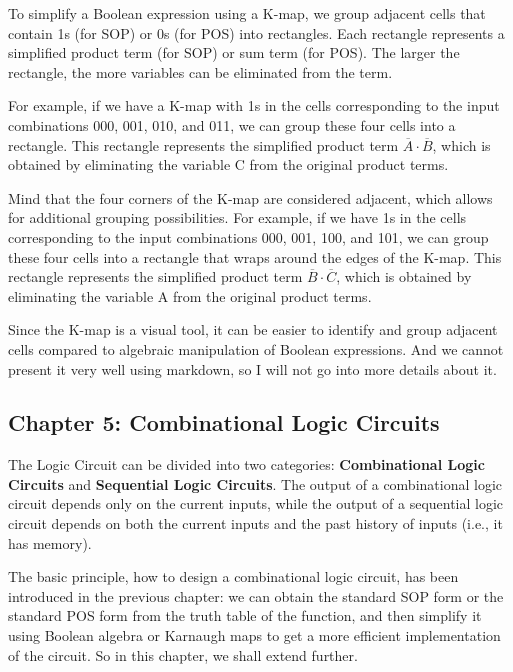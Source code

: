 \documentclass[
  a4paper,
]{article}
\begin{document}
To simplify a Boolean expression using a K-map, we group adjacent cells
that contain 1s (for SOP) or 0s (for POS) into rectangles. Each
rectangle represents a simplified product term (for SOP) or sum term
(for POS). The larger the rectangle, the more variables can be
eliminated from the term.

For example, if we have a K-map with 1s in the cells corresponding to
the input combinations 000, 001, 010, and 011, we can group these four
cells into a rectangle. This rectangle represents the simplified product
term \(\overline{A} \cdot \overline{B}\), which is obtained by
eliminating the variable C from the original product terms.

Mind that the four corners of the K-map are considered adjacent, which
allows for additional grouping possibilities. For example, if we have 1s
in the cells corresponding to the input combinations 000, 001, 100, and
101, we can group these four cells into a rectangle that wraps around
the edges of the K-map. This rectangle represents the simplified product
term \(\overline{B} \cdot \overline{C}\), which is obtained by
eliminating the variable A from the original product terms.

Since the K-map is a visual tool, it can be easier to identify and group
adjacent cells compared to algebraic manipulation of Boolean
expressions. And we cannot present it very well using markdown, so I
will not go into more details about it.

\subsection{Chapter 5: Combinational Logic
Circuits}\label{chapter-5-combinational-logic-circuits}

The Logic Circuit can be divided into two categories:
\textbf{Combinational Logic Circuits} and \textbf{Sequential Logic
Circuits}. The output of a combinational logic circuit depends only on
the current inputs, while the output of a sequential logic circuit
depends on both the current inputs and the past history of inputs (i.e.,
it has memory).

The basic principle, how to design a combinational logic circuit, has
been introduced in the previous chapter: we can obtain the standard SOP
form or the standard POS form from the truth table of the function, and
then simplify it using Boolean algebra or Karnaugh maps to get a more
efficient implementation of the circuit. So in this chapter, we shall
extend further.
\end{document}
